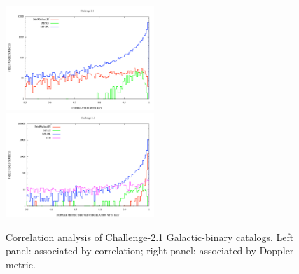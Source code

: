 \documentclass{iopart}
\begin{document}
\begin{figure}
\includegraphics[width=0.5\textwidth]{correlation}
\includegraphics[width=0.5\textwidth]{dcorrelation}
\caption{Correlation analysis of Challenge-2.1 Galactic-binary catalogs. Left panel: associated by correlation; right panel: associated by Doppler metric.\label{fig:correlation}}
\end{figure}
\end{document}
